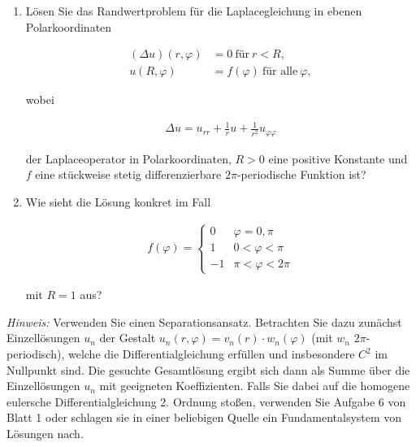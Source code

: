 
\begin{exercise}

\phantom{}

\begin{enumerate}[label = (\roman*)]

    \item Lösen Sie das Randwertproblem für die Laplacegleichung in ebenen Polarkoordinaten
    
    \begin{align*}
        (\Delta u)(r, \varphi)
        & =
        0 ~\text{für}~ r < R, \\
        u(R, \varphi)
        & =
        f(\varphi) ~\text{für alle}~ \varphi,
    \end{align*}

    wobei

    \begin{align*}
        \Delta u
        =
        u_{rr} + \frac{1}{r} u + \frac{1}{r^2} u_{\varphi \varphi}
    \end{align*}

    der Laplaceoperator in Polarkoordinaten, $R > 0$ eine positive Konstante und $f$ eine stückweise stetig differenzierbare $2 \pi$-periodische Funktion ist?

    \item Wie sieht die Lösung konkret im Fall
    
    \begin{align*}
        f(\varphi)
        =
        \begin{cases}
             0 & \varphi = 0, \pi \\
             1 & 0 < \varphi < \pi \\
            -1 & \pi < \varphi < 2 \pi
        \end{cases}
    \end{align*}

    mit $R = 1$ aus?

\end{enumerate}

\textit{Hinweis:}
Verwenden Sie einen Separationsansatz.
Betrachten Sie dazu zunächst Einzellösungen $u_n$ der Gestalt $u_n(r, \varphi) = v_n(r) \cdot w_n(\varphi)$ (mit $w_n$ $2 \pi$-periodisch), welche die Differentialgleichung erfüllen und insbesondere $C^2$ im Nullpunkt sind.
Die gesuchte Gesamtlösung ergibt sich dann als Summe über die Einzellösungen $u_n$ mit geeigneten Koeffizienten.
Falls Sie dabei auf die homogene eulersche Differentialgleichung 2. Ordnung stoßen, verwenden Sie Aufgabe 6 von Blatt 1 oder schlagen sie in einer beliebigen Quelle ein Fundamentalsystem von Lösungen nach.

\end{exercise}

